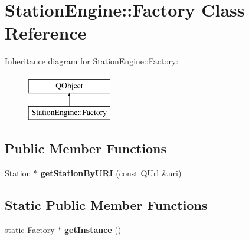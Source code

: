 \hypertarget{classStationEngine_1_1Factory}{}\section{Station\+Engine\+:\+:Factory Class Reference}
\label{classStationEngine_1_1Factory}
Inheritance diagram for Station\+Engine\+:\+:Factory\+:\begin{figure}[H]
\begin{center}
\leavevmode
\includegraphics[height=2.000000cm]{classStationEngine_1_1Factory}
\end{center}
\end{figure}
\subsection*{Public Member Functions}
\begin{DoxyCompactItemize}
\item 
\mbox{\label{classStationEngine_1_1Factory_ad7b0c3ee3716d2a99643c0c7b0b9a9c0}} 
\mbox{\hyperlink{classStationEngine_1_1Station}{Station}} $\ast$ {\bfseries get\+Station\+By\+U\+RI} (const Q\+Url \&uri)
\end{DoxyCompactItemize}
\subsection*{Static Public Member Functions}
\begin{DoxyCompactItemize}
\item 
\mbox{\label{classStationEngine_1_1Factory_a2bca26c84868868d0a58e8313a70a80c}} 
static \mbox{\hyperlink{classStationEngine_1_1Factory}{Factory}} $\ast$ {\bfseries get\+Instance} ()
\end{DoxyCompactItemize}
